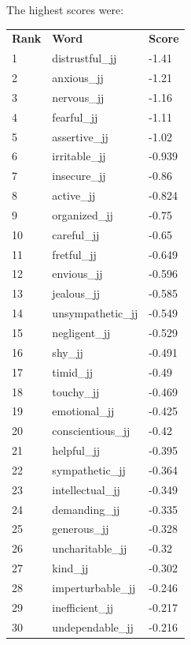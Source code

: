 \documentclass[10pt,letterpaper]{book}
\begin{document}
The highest scores were:
\begin{tabular}{ l l l }
        \textbf{Rank} & \textbf{Word} & \textbf{Score} \\
        1 & distrustful\_jj & -1.41 \\
        2 & anxious\_jj & -1.21 \\
        3 & nervous\_jj & -1.16 \\
        4 & fearful\_jj & -1.11 \\
        5 & assertive\_jj & -1.02 \\
        6 & irritable\_jj & -0.939 \\
        7 & insecure\_jj & -0.86 \\
        8 & active\_jj & -0.824 \\
        9 & organized\_jj & -0.75 \\
        10 & careful\_jj & -0.65 \\
        11 & fretful\_jj & -0.649 \\
        12 & envious\_jj & -0.596 \\
        13 & jealous\_jj & -0.585 \\
        14 & unsympathetic\_jj & -0.549 \\
        15 & negligent\_jj & -0.529 \\
        16 & shy\_jj & -0.491 \\
        17 & timid\_jj & -0.49 \\
        18 & touchy\_jj & -0.469 \\
        19 & emotional\_jj & -0.425 \\
        20 & conscientious\_jj & -0.42 \\
        21 & helpful\_jj & -0.395 \\
        22 & sympathetic\_jj & -0.364 \\
        23 & intellectual\_jj & -0.349 \\
        24 & demanding\_jj & -0.335 \\
        25 & generous\_jj & -0.328 \\
        26 & uncharitable\_jj & -0.32 \\
        27 & kind\_jj & -0.302 \\
        28 & imperturbable\_jj & -0.246 \\
        29 & inefficient\_jj & -0.217 \\
        30 & undependable\_jj & -0.216 \\
\end{tabular}
\end{document}
